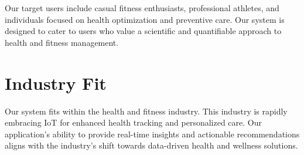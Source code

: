 \documentclass[10pt]{extarticle}
\begin{document}
Our target users include casual fitness enthusiasts, professional athletes, and individuals focused on health optimization and preventive care. Our system is designed to cater to users who value a scientific and quantifiable approach to health and fitness management.

\section{Industry Fit}

Our system fits within the health and fitness industry. This industry is rapidly embracing IoT for enhanced health tracking and personalized care. Our application's ability to provide real-time insights and actionable recommendations aligns with the industry's shift towards data-driven health and wellness solutions.

\newpage

\printbibliography

\newpage
\end{document}
